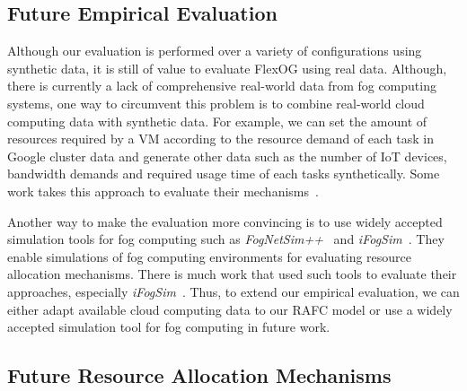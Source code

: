 \documentclass[11pt]{phdthesis}
\begin{document}
\subsection{Future Empirical Evaluation} \label{future empirical evaluation}

Although our evaluation is performed over a variety of configurations using synthetic data, it is still of value to evaluate FlexOG using real data. Although, there is currently a lack of comprehensive real-world data from fog computing systems, one way to circumvent this problem is to combine real-world cloud computing data with synthetic data. For example, we can set the amount of resources required by a VM according to the resource demand of each task in Google cluster data and generate other data such as the number of IoT devices, bandwidth demands and required usage time of each tasks synthetically. Some work takes this approach to evaluate their mechanisms~\citep{zhang2015truthful,shi2017online}. 

Another way to make the evaluation more convincing is to use widely accepted simulation tools for fog computing such as \textit{FogNetSim++}~\citep{qayyum2018fognetsim++} and \textit{iFogSim}~\citep{gupta2017ifogsim}. They enable simulations of fog computing environments for evaluating resource allocation mechanisms. There is much work that used such tools to evaluate their approaches, especially \textit{iFogSim}~\citep{rahbari2017scheduling,taneja2017resource}. Thus, to extend our empirical evaluation, we can either adapt available cloud computing data to our RAFC model or use a widely accepted simulation tool for fog computing in future work. 


\subsection{Future Resource Allocation Mechanisms} \label{future resource allocation mechanisms}
\end{document}
